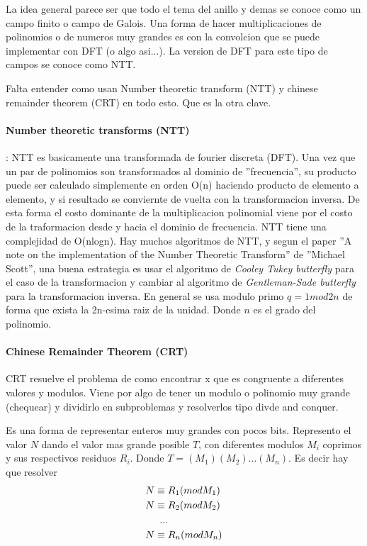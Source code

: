 \documentclass[12pt, oneside]{article}
\begin{document}
La idea general parece ser que todo el tema del anillo y demas se conoce
como un campo finito o campo de Galois.
Una forma de hacer multiplicaciones  de polinomios o de numeros muy grandes es
con la convolcion que se puede implementar con DFT (o algo asi...).
La version de DFT para este tipo de campos se conoce como NTT.


Falta entender como usan Number theoretic transform (NTT) y chinese remainder
theorem (CRT) en todo esto.
Que es la otra clave.

\paragraph{Number theoretic transforms (NTT)}:
NTT es basicamente una transformada de fourier discreta (DFT).
Una vez que un par de polinomios son transformados al dominio de ''frecuencia'',
su producto puede ser calculado simplemente en orden O(n) haciendo producto de elemento
a elemento, y si resultado se conviernte de vuelta con la transformacion inversa.
De esta forma el costo dominante de la multiplicacion polinomial viene por el costo
de la traformacion desde y hacia el dominio de frecuencia.
NTT tiene una complejidad de O(nlogn).
Hay muchos algoritmos de NTT, y segun el paper ''A note on the implementation of the Number
Theoretic Transform'' de ''Michael Scott'',  una buena estrategia es usar
el algoritmo de \textit{Cooley Tukey butterfly} para el caso de la transformacion
y cambiar al algoritmo de \textit{Gentleman-Sade butterfly} para la transformacion
inversa.
En general se usa modulo primo $q=1 mod 2n$ de forma que exista la 2n-esima raiz de
la unidad.
Donde $n$ es el grado del polinomio.

\paragraph{Chinese Remainder Theorem (CRT)}
CRT resuelve el problema de como encontrar x que es congruente a diferentes valores y modulos.
Viene por algo de tener un modulo o polinomio muy grande (chequear) y dividirlo en
subproblemas y resolverlos tipo divde and conquer.

Es una forma de representar enteros muy grandes con pocos bits.
Represento el valor $N$ dando el valor mas grande posible $T$, con diferentes modulos $M_i$
coprimos y sus respectivos residuos $R_i$.
Donde $T=(M_1)(M_2)...(M_n)$.
Es decir hay que resolver
\begin{align*}
  &N \equiv R_1 (mod M_1) \\
  & N \equiv R_2 (mod M_2) \\
  & \hspace{0.5cm}... \\
  &N \equiv R_n (mod M_n)
\end{align*}
\end{document}

